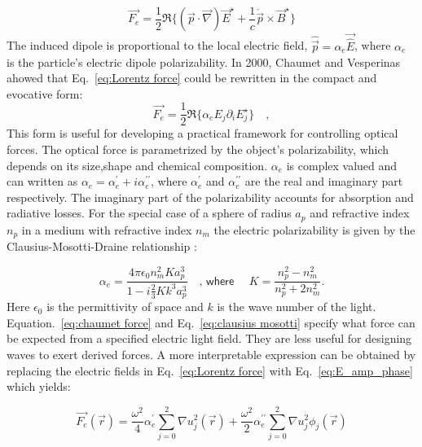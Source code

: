 \begin{equation}
\label{eq:Lorentz force}
\vec{F_e}  = \frac{1}{2} \Re \lbrace (\vec{p}\cdot \vec{\nabla})\vec{E}^\star + \frac{1}{c} \dot{\vec{p}}\times \vec{B}^\star \rbrace 
\end{equation}
The induced dipole is proportional to the local electric field, $\hat{\vec{p}} = \alpha _{e}\vec{\hat{E}}$, where $\alpha _{e}$ is the particle's electric dipole polarizability. In 2000, Chaumet and Vesperinas \cite{Chaumet:00} ahowed that Eq.~\eqref{eq:Lorentz force} could be rewritten in the compact and evocative form:
\begin{equation}
\label{eq:chaumet force}
\vec{F_e} = \frac{1}{2} \Re \lbrace \alpha _{e} E_j \partial _i E^\star _{j} \rbrace \quad ,
\end{equation}
This form is useful for developing a practical framework for controlling optical forces. The optical force is parametrized by the object's polarizability, which depends on its size,shape and chemical composition. $\alpha _e$ is complex valued and can written as $\alpha _e = \alpha^{\prime}_e + i \alpha ^{\prime \prime}_{e}$, where $\alpha ^{\prime}_{e}$ and $\alpha ^{\prime \prime}_{e}$ are the real and imaginary part \cite{jackson_classical_1999} respectively. The imaginary part of the polarizability accounts for absorption and radiative losses. For the special case of a sphere of radius $a_p$ and refractive index $n_p$ in a medium with refractive index $n_m$ the electric polarizability is given by the Clausius-Mosotti-Draine relationship \cite{draine1993}:

\begin{equation}
\label{eq:clausius mosotti}
\alpha _e = \frac{4\pi \epsilon _0 n^2_m K a^3_p}{1-i\frac{2}{3}K k^3 a^3_p} \quad \textsf{, where }\quad K = \frac{n^2_p - n^2_m}{n^2_p + 2n^2_m}.
\end{equation}
Here $\epsilon _{0}$ is the permittivity of space and $k$ is the wave number of the light. Equation.~\eqref{eq:chaumet force} and Eq.~\eqref{eq:clausius mosotti} specify what force can be expected from a specified electric light field. They are less useful for designing waves to exert derived forces. A more interpretable expression can be obtained by replacing the electric fields in Eq.~\eqref{eq:Lorentz force} with Eq.~\eqref{eq:E_amp_phase} which yields:

\begin{equation}
\label{eq:Electric Lorentz force}
\vec{F_e}(\vec{r}) = \frac{\omega ^2}{4}\alpha ^{\prime} _{e} \sum _{j=0}^{2}\nabla u_{j}^{2}(\vec{r}) + \frac{\omega ^2}{2} \alpha ^{\prime \prime}_{e} \sum _{j=0}^{2} \nabla u_{j}^{2}\phi _{j}(\vec{r})
\end{equation}

